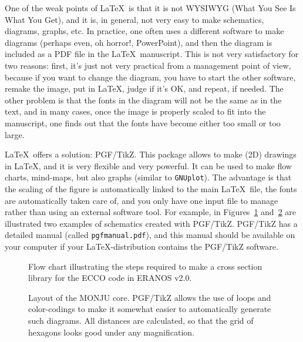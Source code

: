 \documentclass[12pt]{article}
\begin{document}
One of the weak points of \LaTeX\ is that it is not WYSIWYG (What You See Is What You Get), and it is, in general, not very easy to make schematics, diagrams, graphs, etc. In practice, one often uses a different software to make diagrams (perhaps even, oh horror!, PowerPoint), and then the diagram is included as a PDF file in the \LaTeX\ manuscript. This is not very satisfactory for two reasons: first, it's just not very practical from a management point of view, because if you want to change the diagram, you have to start the other software, remake the image, put in \LaTeX, judge if it's OK, and repeat, if needed. The other problem is that the fonts in the diagram will not be the same as in the text, and in many cases, once the image is properly scaled to fit into the manuscript, one finds out that the fonts have become either too small or too large.

\LaTeX\  offers a solution: PGF/TikZ. This package allows to make (2D) drawings in \LaTeX, and it is very flexible and very powerful. It can be used to make flow charts, mind-maps, but also graphs (similar to \texttt{GNUplot}). The advantage is that the scaling of the figure is automatically linked to the main \LaTeX\ file, the fonts are automatically taken care of, and you only have one input file to manage rather than using an external software tool. For example, in Figures~\ref{fig::ecco} and~\ref{fig::monju} are illustrated two examples of schematics created with PGF/TikZ. PGF/TikZ has a detailed manual (called \texttt{pgfmanual.pdf}), and this manual should be available on your computer if your \LaTeX-distribution contains the PGF/TikZ software.

\begin{figure}
  \begin{center}
    
    \caption[]{Flow chart illustrating the steps required to make a cross section library for the ECCO code in ERANOS v2.0.}\label{fig::ecco}
  \end{center}
\end{figure}

\begin{figure}
  \begin{center}
    
    \caption[]{Layout of the MONJU core. PGF/TikZ allows the use of loops and color-codings to make it somewhat easier to automatically generate such diagrams. All distances are calculated, so that the grid of hexagons looks good under any magnification.}\label{fig::monju}
  \end{center}
\end{figure}
\end{document}
